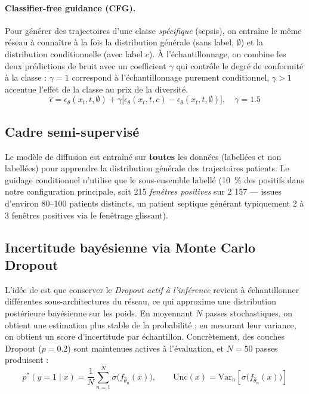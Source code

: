 \documentclass[11pt,a4paper]{article}
\begin{document}
\paragraph{Classifier-free guidance (CFG).}
Pour générer des trajectoires d'une classe \emph{spécifique} (sepsis), on entraîne le
même réseau à connaître à la fois la distribution générale (sans label, $\emptyset$)
et la distribution conditionnelle (avec label $c$). À l'échantillonnage, on combine
les deux prédictions de bruit avec un coefficient $\gamma$ qui contrôle le degré de
conformité à la classe : $\gamma = 1$ correspond à l'échantillonnage purement
conditionnel, $\gamma > 1$ accentue l'effet de la classe au prix de la diversité.
\[
\hat{\epsilon} = \epsilon_\theta(x_t, t, \emptyset)
    + \gamma \bigl[\epsilon_\theta(x_t, t, c) - \epsilon_\theta(x_t, t, \emptyset)\bigr],
    \quad \gamma = 1.5
\]

\subsection{Cadre semi-supervisé}

Le modèle de diffusion est entraîné sur \textbf{toutes} les données (labellées et non
labellées) pour apprendre la distribution générale des trajectoires patients. Le guidage
conditionnel n'utilise que le sous-ensemble labellé (10~\% des positifs dans notre
configuration principale, soit 215 \emph{fenêtres positives} sur 2 157 — issues
d'environ 80--100 patients distincts, un patient septique générant typiquement 2 à 3
fenêtres positives via le fenêtrage glissant).

\subsection{Incertitude bayésienne via Monte Carlo Dropout}

L'idée de \cite{gal2016dropout} est que conserver le \emph{Dropout actif à l'inférence}
revient à échantillonner différentes sous-architectures du réseau, ce qui approxime
une distribution postérieure bayésienne sur les poids. En moyennant $N$ passes
stochastiques, on obtient une estimation plus stable de la probabilité ; en mesurant
leur variance, on obtient un score d'incertitude par échantillon. Concrètement, des
couches Dropout ($p=0.2$) sont maintenues actives à l'évaluation, et $N=50$ passes
produisent :
\[
p^*(y=1 \mid x) = \frac{1}{N}\sum_{n=1}^N \sigma\!\bigl(f_{\hat{\theta}_n}(x)\bigr),
\qquad
\text{Unc}(x) = \mathrm{Var}_{n}\!\left[\sigma\!\bigl(f_{\hat{\theta}_n}(x)\bigr)\right]
\]
\end{document}
